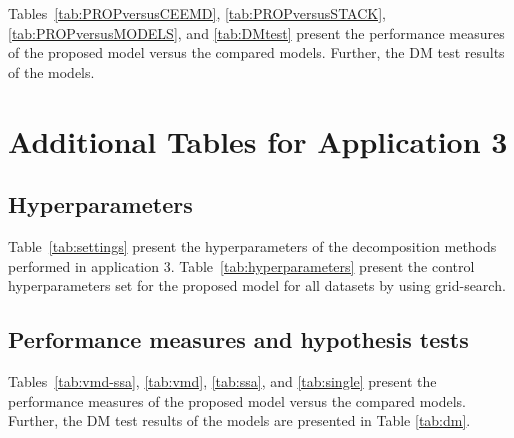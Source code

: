 \begin{apendicesenv}
\begin{landscape}
Tables~\ref{tab:PROPversusCEEMD}, \ref{tab:PROPversusSTACK}, \ref{tab:PROPversusMODELS}, and \ref{tab:DMtest} present the performance measures of the proposed model versus the compared models. Further, the \ac{DM} test results of the models. 





\end{landscape}

\chapter{Additional Tables for Application 3}
\setcounter{table}{0}
\renewcommand{\thetable}{C\arabic{table}}

\section*{Hyperparameters \label{app:hyper3}}
Table~\ref{tab:settings} present the hyperparameters of the decomposition methods performed in application 3. Table~\ref{tab:hyperparameters} present the control hyperparameters set for the proposed model for all datasets by using grid-search. 



\begin{landscape}
\section*{Performance measures and hypothesis tests}
Tables~\ref{tab:vmd-ssa}, \ref{tab:vmd}, \ref{tab:ssa}, and \ref{tab:single} present the performance measures of the proposed model versus the compared models. Further, the \ac{DM} test results of the models are presented in Table \ref{tab:dm}. 





\end{landscape}

\begin{landscape}

\end{landscape}



\end{apendicesenv}